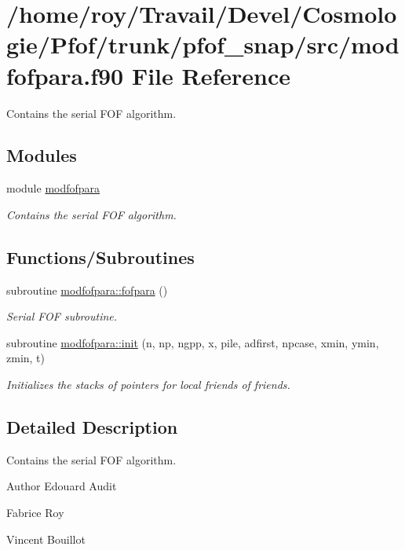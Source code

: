 \hypertarget{pfof__snap_2src_2modfofpara_8f90}{}\section{/home/roy/\+Travail/\+Devel/\+Cosmologie/\+Pfof/trunk/pfof\+\_\+snap/src/modfofpara.f90 File Reference}
\label{pfof__snap_2src_2modfofpara_8f90}


Contains the serial F\+OF algorithm.  


\subsection*{Modules}
\begin{DoxyCompactItemize}
\item 
module \hyperlink{namespacemodfofpara}{modfofpara}
\begin{DoxyCompactList}\small\item\em Contains the serial F\+OF algorithm. \end{DoxyCompactList}\end{DoxyCompactItemize}
\subsection*{Functions/\+Subroutines}
\begin{DoxyCompactItemize}
\item 
subroutine \hyperlink{namespacemodfofpara_a0e76e564f41683dc0c0104fc789718b0}{modfofpara\+::fofpara} ()
\begin{DoxyCompactList}\small\item\em Serial F\+OF subroutine. \end{DoxyCompactList}\item 
subroutine \hyperlink{namespacemodfofpara_a5294ecab752fb3cfbea3bec7cd28a29a}{modfofpara\+::init} (n, np, ngpp, x, pile, adfirst, npcase, xmin, ymin, zmin, t)
\begin{DoxyCompactList}\small\item\em Initializes the stacks of pointers for local friends of friends. \end{DoxyCompactList}\end{DoxyCompactItemize}


\subsection{Detailed Description}
Contains the serial F\+OF algorithm. 

\begin{DoxyAuthor}{Author}
Edouard Audit 

Fabrice Roy 

Vincent Bouillot 
\end{DoxyAuthor}
